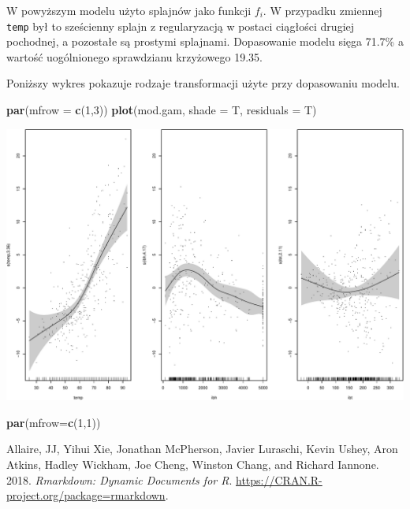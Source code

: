 \documentclass[]{book}
\newenvironment{Shaded}{\begin{snugshade}}{\end{snugshade}}
\newcommand{\DataTypeTok}[1]{\textcolor[rgb]{0.13,0.29,0.53}{#1}}
\newcommand{\DecValTok}[1]{\textcolor[rgb]{0.00,0.00,0.81}{#1}}
\newcommand{\KeywordTok}[1]{\textcolor[rgb]{0.13,0.29,0.53}{\textbf{#1}}}
\newcommand{\NormalTok}[1]{#1}
\theoremstyle{plain}
\theoremstyle{definition}
\theoremstyle{definition}
\theoremstyle{definition}
\theoremstyle{definition}
\theoremstyle{remark}
\begin{document}
W powyższym modelu użyto splajnów jako funkcji \(f_i\). W przypadku zmiennej \texttt{temp} był to sześcienny splajn z regularyzacją w postaci ciągłości drugiej pochodnej, a pozostałe są prostymi splajnami. Dopasowanie modelu sięga 71.7\% a wartość uogólnionego sprawdzianu krzyżowego 19.35.

Poniższy wykres pokazuje rodzaje transformacji użyte przy dopasowaniu modelu.

\begin{Shaded}
\begin{Highlighting}[]
\KeywordTok{par}\NormalTok{(}\DataTypeTok{mfrow =} \KeywordTok{c}\NormalTok{(}\DecValTok{1}\NormalTok{,}\DecValTok{3}\NormalTok{))}
\KeywordTok{plot}\NormalTok{(mod.gam, }\DataTypeTok{shade =}\NormalTok{ T, }\DataTypeTok{residuals =}\NormalTok{ T)}
\end{Highlighting}
\end{Shaded}

\includegraphics{EksploracjaDanych_files/figure-latex/unnamed-chunk-85-1.pdf}

\begin{Shaded}
\begin{Highlighting}[]
\KeywordTok{par}\NormalTok{(}\DataTypeTok{mfrow=}\KeywordTok{c}\NormalTok{(}\DecValTok{1}\NormalTok{,}\DecValTok{1}\NormalTok{))}
\end{Highlighting}
\end{Shaded}

\hypertarget{refs}{}
\leavevmode\hypertarget{ref-R-rmarkdown}{}%
Allaire, JJ, Yihui Xie, Jonathan McPherson, Javier Luraschi, Kevin Ushey, Aron Atkins, Hadley Wickham, Joe Cheng, Winston Chang, and Richard Iannone. 2018. \emph{Rmarkdown: Dynamic Documents for R}. \url{https://CRAN.R-project.org/package=rmarkdown}.
\end{document}
